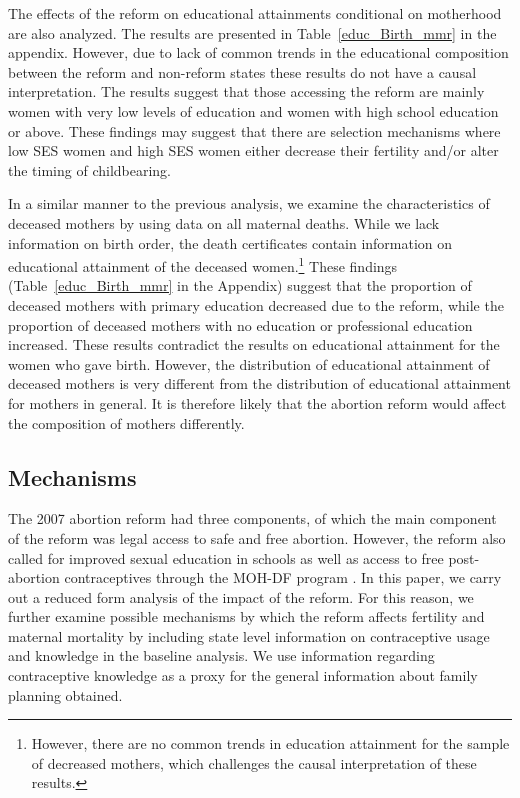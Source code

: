 \documentclass[a4paper, 11pt]{article}
\begin{document}
\begin{spacing}{2}
The effects of the reform on educational attainments conditional on motherhood are also analyzed. The results are presented in Table~\ref{educ_Birth_mmr} in the appendix. However, due to lack of common trends in the educational composition between the reform and non-reform states these results do not have a causal interpretation. The results suggest that those accessing the reform are mainly women with very low levels of education and women with high school education or above. These findings may suggest that there are selection mechanisms where low SES women and high SES women either decrease their fertility and/or alter the timing of childbearing. 
 
 In a similar manner to the previous analysis, we examine the characteristics of deceased mothers by using data on all maternal deaths. While we lack information on birth order, the death certificates contain information on educational attainment of the deceased women.\footnote{However, there are no common trends in education attainment for the sample of decreased mothers, which challenges the causal interpretation of these results.} These findings (Table~\ref{educ_Birth_mmr} in the Appendix) suggest that the proportion of deceased mothers with primary education decreased due to the reform, while the proportion of deceased mothers with no education or professional education increased. These results contradict the results on educational attainment for the women who gave birth. However, the distribution of educational attainment of deceased mothers is very different from the distribution of educational attainment for mothers in general. It is therefore likely that the abortion reform would affect the composition of mothers differently. 

 
\subsection{Mechanisms}\label{Mechanisms}
The 2007 abortion reform had three components, of which the main component of the reform was legal access to safe and free abortion. However, the reform also called for improved sexual education in schools as well as access to free post-abortion contraceptives through the MOH-DF program \citep{Becker}. In this paper, we carry out a reduced form analysis of the impact of the reform. For this reason, we further examine possible mechanisms by which the reform affects fertility and maternal mortality by including state level information on contraceptive usage and knowledge in the baseline analysis. We use information regarding contraceptive knowledge as a proxy for the general information about family planning obtained.


\end{spacing}
\end{document}
